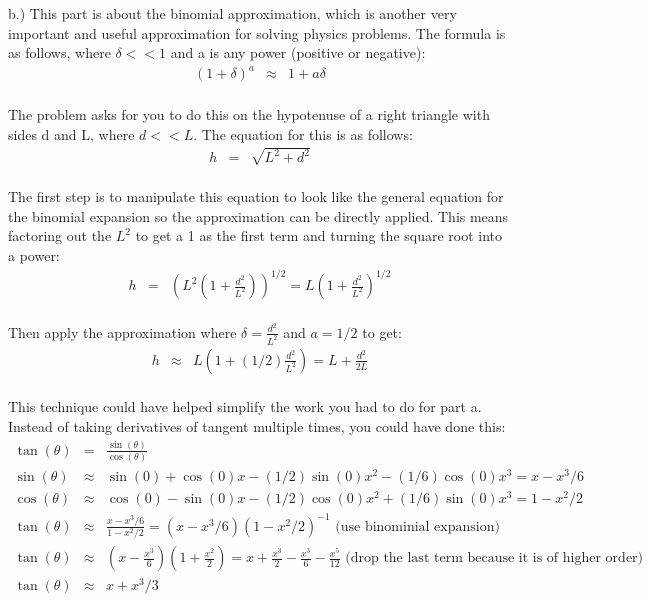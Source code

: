\documentclass[11pt]{amsart}
\begin{document}
b.) This part is about the binomial approximation, which is another very important and useful approximation for solving physics problems. The formula is as follows, where $\delta<<1$ and a is any power (positive or negative): \\
\begin{eqnarray}
(1+\delta)^{a} &\approx& 1 + a\delta \nonumber
\end{eqnarray} \\
The problem asks for you to do this on the hypotenuse of a right triangle with sides d and L, where $d<<L$. The equation for this is as follows: \\
\begin{eqnarray}
h &=& \sqrt{L^{2} + d^{2}} \nonumber
\end{eqnarray}\\
The first step is to manipulate this equation to look like the general equation for the binomial expansion so the approximation can be directly applied. This means factoring out the $L^{2}$ to get a 1 as the first term and turning the square root into a power: \\  
\begin{eqnarray} 
h &=& (L^{2}(1 + \frac{d^{2}}{L^{2}}))^{1/2} = L(1 + \frac{d^{2}}{L^{2}})^{1/2} \nonumber
\end{eqnarray} \\
Then apply the approximation where $\delta=\frac{d^{2}}{L^{2}}$ and $a=1/2$ to get: \\ 
\begin{eqnarray}
h &\approx& L(1 + (1/2)\frac{d^{2}}{L^{2}}) = L + \frac{d^{2}}{2L} \nonumber
\end{eqnarray}  \\
This technique could have helped simplify the work you had to do for part a. Instead of taking derivatives of tangent multiple times, you could have done this: \\ 
\begin{eqnarray} 
\tan(\theta) &=& \frac{\sin(\theta)}{\cos(\theta)} \nonumber \\
\sin(\theta) &\approx& \sin(0)+\cos(0)x -(1/2)\sin(0)x^{2}-(1/6)\cos(0)x^{3} = x-x^{3}/6 \nonumber \\
\cos(\theta) &\approx& \cos(0)-\sin(0)x-(1/2)\cos(0)x^{2}+(1/6) \sin(0)x^{3} = 1-x^{2}/2 \nonumber \\
\tan(\theta) &\approx& \frac{x-x^{3}/6}{1-x^{2}/2} = (x-x^{3}/6)(1-x^{2}/2)^{-1} \mbox{ (use binominial expansion)} \nonumber \\
\tan(\theta) &\approx& (x-\frac{x^{3}}{6})(1+\frac{x^{2}}{2}) = x+\frac{x^{3}}{2}-\frac{x^{3}}{6}-\frac{x^{5}}{12} \mbox{ (drop the last term because it is of higher order)} \nonumber \\
\tan(\theta) &\approx& x+x^{3}/3  \nonumber
\end{eqnarray} \\
\end{document}
